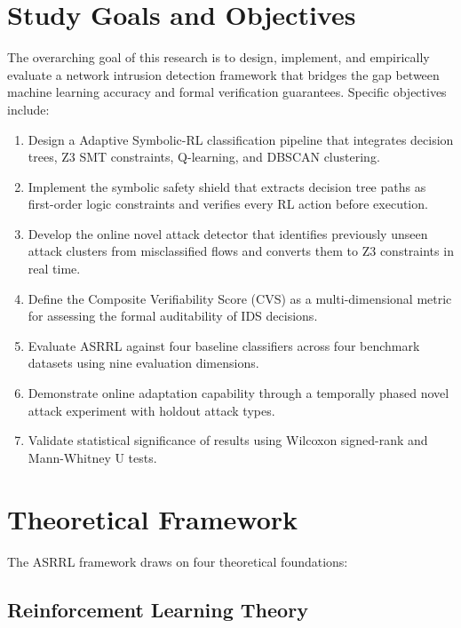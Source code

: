 \documentclass[12pt, letterpaper, oneside]{report}
\newcommand{\ASRRL}{\textsc{ASRRL}}
\begin{document}
\section{Study Goals and Objectives}
\label{sec:study_goals}

The overarching goal of this research is to design, implement, and empirically evaluate a network intrusion detection framework that bridges the gap between machine learning accuracy and formal verification guarantees. Specific objectives include:

\begin{enumerate}[label=\textbf{O\arabic*.}]
    \item Design a Adaptive Symbolic-RL classification pipeline that integrates decision trees, Z3 SMT constraints, Q-learning, and DBSCAN clustering.
    \item Implement the symbolic safety shield that extracts decision tree paths as first-order logic constraints and verifies every RL action before execution.
    \item Develop the online novel attack detector that identifies previously unseen attack clusters from misclassified flows and converts them to Z3 constraints in real time.
    \item Define the Composite Verifiability Score (CVS) as a multi-dimensional metric for assessing the formal auditability of IDS decisions.
    \item Evaluate \ASRRL{} against four baseline classifiers across four benchmark datasets using nine evaluation dimensions.
    \item Demonstrate online adaptation capability through a temporally phased novel attack experiment with holdout attack types.
    \item Validate statistical significance of results using Wilcoxon signed-rank and Mann-Whitney U tests.
\end{enumerate}


\section{Theoretical Framework}
\label{sec:theoretical_framework}

The \ASRRL{} framework draws on four theoretical foundations:

\subsection{Reinforcement Learning Theory}
\end{document}
